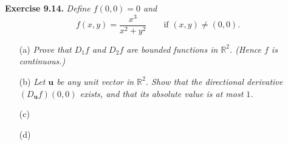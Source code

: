 \documentclass{article}
\begin{document}



\textbf{Exercise 9.14.}
\emph{Define $f(0,0) = 0$ and}
\[
  f(x,y) = \frac{x^3}{x^2 + y^2}
  \qquad \text{if }
  (x,y) \neq (0,0).
\]
\begin{enumerate}
\item[(a)]
  \emph{Prove that $D_1 f$ and $D_2 f$ are bounded functions in $\mathbb{R}^2$.
  (Hence $f$ is continuous.)}

\item[(b)]
  \emph{Let $\mathbf{u}$ be any unit vector in $\mathbb{R}^2$.
  Show that the directional derivative
  $(D_{\mathbf{u}}f)(0,0)$ exists, and that its absolute value is at most $1$.}

\item[(c)]

\item[(d)]

\end{enumerate}
\end{document}
